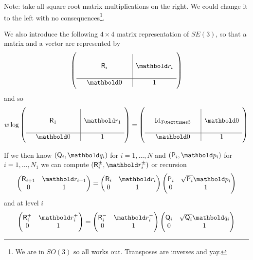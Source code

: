 \documentclass[palatino]{epflnotes}
\begin{document}
Note: take all square root matrix multiplications on the right. We could change it to the left with no consequences\footnote{We are in $SO(3)$ so all works out. Transposes are inverses and yay.}.

We also introduce the following $4×4$ matrix representation of $SE(3)$, so that a matrix and a vector are represented by \[ \left(\begin{array}{ccc|c}
 & & &  \\
 & \mR_i& & \vec{r_i} \\
 & & &  \\ \hline
 & \vec{0} & & 1
\end{array}\right) \] and so \[ w \log \left(\begin{array}{ccc|c}
 & & &  \\
 & \mR_1 & & \vec{r_1} \\
 & & &  \\ \hline
 & \vec{0} & & 1
\end{array}\right) = \left(\begin{array}{ccc|c}
 & & &  \\
 & \mop{Id}_{3 × 3} & & \vec{0} \\
 & & &  \\ \hline
 & \vec{0} & & 1
\end{array}\right)\]

If we then know $(\mQ_i, \vq_i)$ for $i = 1,\dotsc, N$ and $(\mP_i, \vp_i)$ for $i = 1, \dotsc, N_1$ we can compute $(\mR_i^{\pm}, \vr_i^{\pm})$ or recursion \[ \begin{pmatrix} \mR_{i+1} & \vr_{i+1} \\ 0 & 1 \end{pmatrix} = \begin{pmatrix}\mR_i & \vr_i \\ 0 & 1 \end{pmatrix} \begin{pmatrix} \mP_i & \sqrt{\mP_i} \vp_i \\ 0 & 1 \end{pmatrix} \]
and at level $i$ \[ \begin{pmatrix} \mR_i^+ & \vr_i^+ \\ 0 & 1 \end{pmatrix} = \begin{pmatrix} \mR_i^{-} & \vr_i^- \\ 0 & 1 \end{pmatrix} \begin{pmatrix} \mQ_i & \sqrt{\mQ_i} \vq_i \\ 0 & 1 \end{pmatrix} \]
\end{document}
